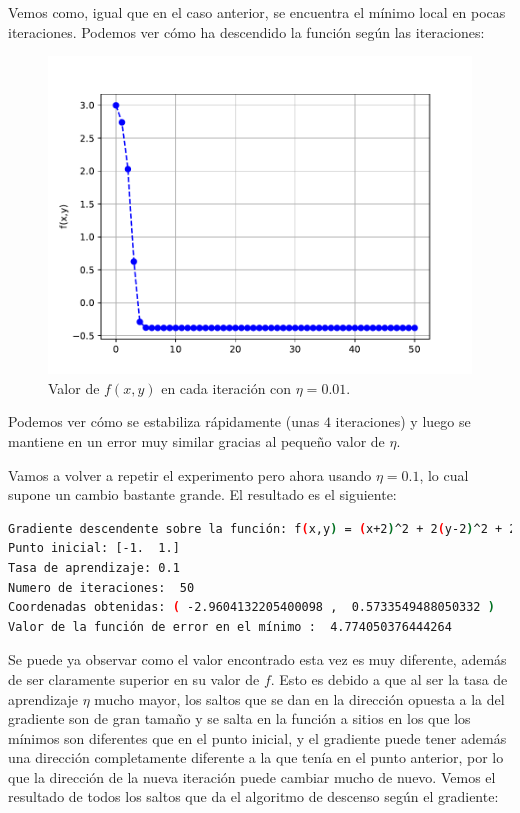 \documentclass[12pt]{scrartcl}
\begin{document}
{Vemos como, igual que en el caso anterior, se encuentra el mínimo local en pocas iteraciones. Podemos ver cómo ha descendido la función según las iteraciones:

\begin{figure}[H]
  \centering
  \includegraphics[scale=0.6]{media/f_evolution_e1-2-001.pdf}
  \caption{Valor de $f(x,y)$ en cada iteración con $\eta = 0.01$.}
\end{figure}

Podemos ver cómo se estabiliza rápidamente (unas $4$ iteraciones) y luego se mantiene en un error muy similar gracias al pequeño valor de $\eta$.

Vamos a volver a repetir el experimento pero ahora usando $\eta = 0.1$, lo cual supone un cambio bastante grande. El resultado es el siguiente:

\begin{lstlisting}[language=bash]
Gradiente descendente sobre la función: f(x,y) = (x+2)^2 + 2(y-2)^2 + 2 sin(2pi x) sin(2pi y)
Punto inicial: [-1.  1.]
Tasa de aprendizaje: 0.1
Numero de iteraciones:  50
Coordenadas obtenidas: ( -2.9604132205400098 ,  0.5733549488050332 )
Valor de la función de error en el mínimo :  4.774050376444264
\end{lstlisting}

Se puede ya observar como el valor encontrado esta vez es muy diferente, además de ser claramente superior en su valor de $f$. 
Esto es debido a que al ser la tasa de aprendizaje $\eta$ mucho mayor, los saltos que se dan en la dirección opuesta a la del gradiente son de gran tamaño y se salta en la función a sitios en los que los mínimos son
diferentes que en el punto inicial, y el gradiente puede tener además una dirección completamente diferente a la que tenía en el punto anterior, por lo que la dirección de la nueva iteración puede cambiar mucho de nuevo. Vemos el resultado de todos los saltos que
da el algoritmo de descenso según el gradiente:

}
\end{document}
